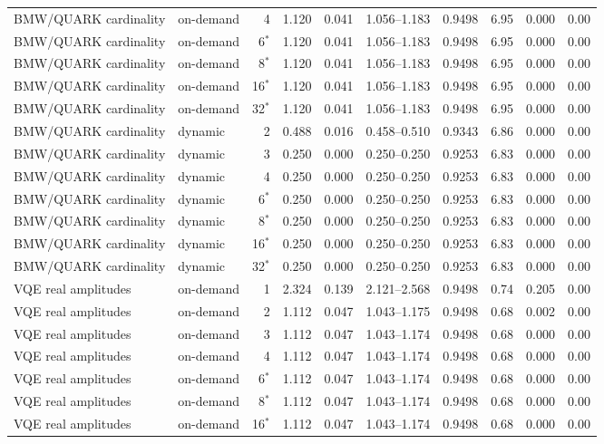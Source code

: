 {\begin{longtable}{@{}llrrrrrrrr@{}}
BMW/QUARK cardinality & on-demand & 4 & 1.120 & 0.041 & 1.056--1.183 & 0.9498 & 6.95 & 0.000 & 0.00 \\
BMW/QUARK cardinality & on-demand & 6$^*$ & 1.120 & 0.041 & 1.056--1.183 & 0.9498 & 6.95 & 0.000 & 0.00 \\
BMW/QUARK cardinality & on-demand & 8$^*$ & 1.120 & 0.041 & 1.056--1.183 & 0.9498 & 6.95 & 0.000 & 0.00 \\
BMW/QUARK cardinality & on-demand & 16$^*$ & 1.120 & 0.041 & 1.056--1.183 & 0.9498 & 6.95 & 0.000 & 0.00 \\
BMW/QUARK cardinality & on-demand & 32$^*$ & 1.120 & 0.041 & 1.056--1.183 & 0.9498 & 6.95 & 0.000 & 0.00 \\
BMW/QUARK cardinality & dynamic & 2 & 0.488 & 0.016 & 0.458--0.510 & 0.9343 & 6.86 & 0.000 & 0.00 \\
BMW/QUARK cardinality & dynamic & 3 & 0.250 & 0.000 & 0.250--0.250 & 0.9253 & 6.83 & 0.000 & 0.00 \\
BMW/QUARK cardinality & dynamic & 4 & 0.250 & 0.000 & 0.250--0.250 & 0.9253 & 6.83 & 0.000 & 0.00 \\
BMW/QUARK cardinality & dynamic & 6$^*$ & 0.250 & 0.000 & 0.250--0.250 & 0.9253 & 6.83 & 0.000 & 0.00 \\
BMW/QUARK cardinality & dynamic & 8$^*$ & 0.250 & 0.000 & 0.250--0.250 & 0.9253 & 6.83 & 0.000 & 0.00 \\
BMW/QUARK cardinality & dynamic & 16$^*$ & 0.250 & 0.000 & 0.250--0.250 & 0.9253 & 6.83 & 0.000 & 0.00 \\
BMW/QUARK cardinality & dynamic & 32$^*$ & 0.250 & 0.000 & 0.250--0.250 & 0.9253 & 6.83 & 0.000 & 0.00 \\
VQE real amplitudes & on-demand & 1 & 2.324 & 0.139 & 2.121--2.568 & 0.9498 & 0.74 & 0.205 & 0.00 \\
VQE real amplitudes & on-demand & 2 & 1.112 & 0.047 & 1.043--1.175 & 0.9498 & 0.68 & 0.002 & 0.00 \\
VQE real amplitudes & on-demand & 3 & 1.112 & 0.047 & 1.043--1.174 & 0.9498 & 0.68 & 0.000 & 0.00 \\
VQE real amplitudes & on-demand & 4 & 1.112 & 0.047 & 1.043--1.174 & 0.9498 & 0.68 & 0.000 & 0.00 \\
VQE real amplitudes & on-demand & 6$^*$ & 1.112 & 0.047 & 1.043--1.174 & 0.9498 & 0.68 & 0.000 & 0.00 \\
VQE real amplitudes & on-demand & 8$^*$ & 1.112 & 0.047 & 1.043--1.174 & 0.9498 & 0.68 & 0.000 & 0.00 \\
VQE real amplitudes & on-demand & 16$^*$ & 1.112 & 0.047 & 1.043--1.174 & 0.9498 & 0.68 & 0.000 & 0.00 \\

\end{longtable}}
